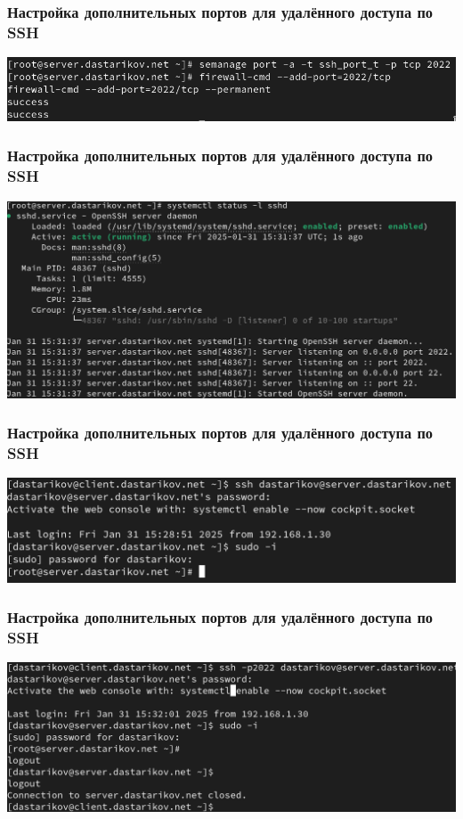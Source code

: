 \begin{frame}
\frametitle{Настройка дополнительных портов для удалённого доступа по SSH}
  \centering
  \includegraphics[width=\textwidth]{../images/image07.png}
\end{frame}

\begin{frame}
\frametitle{Настройка дополнительных портов для удалённого доступа по SSH}
  \centering
  \includegraphics[width=\textwidth]{../images/image08.png}
\end{frame}

\begin{frame}
\frametitle{Настройка дополнительных портов для удалённого доступа по SSH}
  \centering
  \includegraphics[width=\textwidth]{../images/image09.png}
\end{frame}

\begin{frame}
\frametitle{Настройка дополнительных портов для удалённого доступа по SSH}
  \centering
  \includegraphics[width=\textwidth]{../images/image10.png}
\end{frame}

